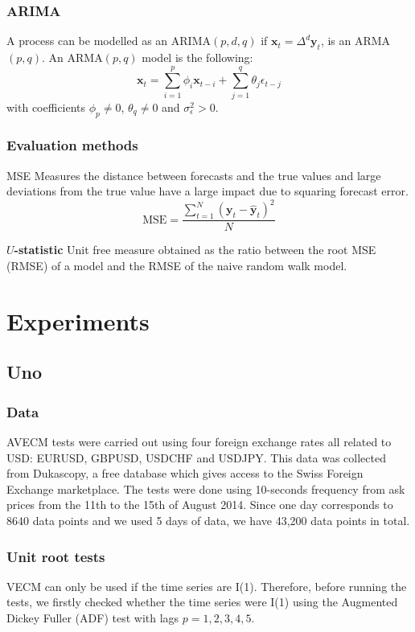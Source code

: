 \documentclass[compress,red]{beamer}
\begin{document}
\begin{frame}
\frametitle{ARIMA}
A process can be modelled as an ARIMA$(p,d,q)$ if $\mathbf{x}_t = \Delta^d \mathbf{y}_t $, is an ARMA$(p,q)$. An ARMA$(p,q)$ model is the following:
\begin{equation}
\mathbf{x}_t = \sum_{i=1}^p \phi_i \mathbf{x}_{t-i}  +  \sum_{j=1}^q \theta_j \epsilon_{t-j}  
\end{equation}
\noindent with coefficients $\phi_p \neq 0$, $\theta_q \neq 0$ and $\sigma_{\epsilon}^2 > 0$.
\end{frame}

\begin{frame}
\frametitle{Evaluation methods}
\begin{block}{MSE}
Measures the distance between forecasts
and the true values and large deviations from the true value have a
large impact due to squaring forecast error.
{\color{blue}
\begin{equation}\label{eq:MSE}
\text{MSE} = 
\frac{\displaystyle \sum_{t=1}^{N} (\mathbf{y}_t-\hat{\mathbf{y}}_t)^2}{N}
\end{equation}}
\end{block}
\begin{block}{\bf $U$-statistic}
Unit free measure obtained as the ratio between the root MSE (RMSE) of a model and the RMSE of the naive random walk model. 
\end{block}
\end{frame}

\section{Experiments}
\subsection{Uno}
\begin{frame}
\frametitle{Data}
AVECM tests were carried out using four foreign exchange rates all related to
USD: EURUSD, GBPUSD, USDCHF and USDJPY. This data was collected from Dukascopy, a free
database which gives access to the Swiss Foreign Exchange marketplace.
The tests were done using 10-seconds frequency from ask prices
from the 11th to the 15th of August 2014. Since one day corresponds to 8640 data points and we used 5 days of data, we have 43,200 data points in total.
\end{frame}

\begin{frame}
\frametitle{Unit root tests}
VECM can only be used if the time series are I(1). Therefore, 
before running the tests, we firstly checked whether the time series were
I(1) using the Augmented Dickey Fuller (ADF) test with lags $p=1,2,3,4,5$.
\end{frame}
\end{document}
